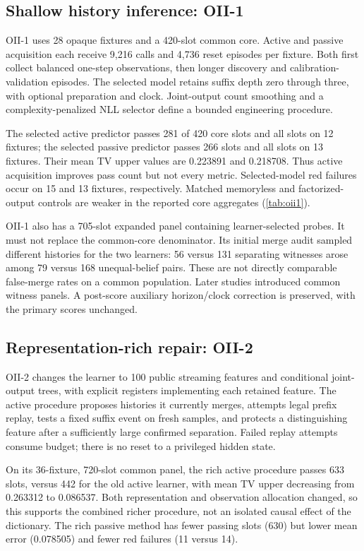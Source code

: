 \subsection{Shallow history inference: OII-1}\label{p3:c03}
OII-1 uses 28 opaque fixtures and a 420-slot common core. Active and passive acquisition each receive 9,216 calls and 4,736 reset episodes per fixture. Both first collect balanced one-step observations, then longer discovery and calibration-validation episodes. The selected model retains suffix depth zero through three, with optional preparation and clock. Joint-output count smoothing and a complexity-penalized NLL selector define a bounded engineering procedure.

The selected active predictor passes 281 of 420 core slots and all slots on 12 fixtures; the selected passive predictor passes 266 slots and all slots on 13 fixtures. Their mean TV upper values are 0.223891 and 0.218708. Thus active acquisition improves pass count but not every metric. Selected-model red failures occur on 15 and 13 fixtures, respectively. Matched memoryless and factorized-output controls are weaker in the reported core aggregates (\cref{tab:oii1}).

OII-1 also has a 705-slot expanded panel containing learner-selected probes. It must not replace the common-core denominator. Its initial merge audit sampled different histories for the two learners: 56 versus 131 separating witnesses arose among 79 versus 168 unequal-belief pairs. These are not directly comparable false-merge rates on a common population. Later studies introduced common witness panels. A post-score auxiliary horizon/clock correction is preserved, with the primary scores unchanged.

\subsection{Representation-rich repair: OII-2}\label{p3:c04}\label{p3:c05}
OII-2 changes the learner to 100 public streaming features and conditional joint-output trees, with explicit registers implementing each retained feature. The active procedure proposes histories it currently merges, attempts legal prefix replay, tests a fixed suffix event on fresh samples, and protects a distinguishing feature after a sufficiently large confirmed separation. Failed replay attempts consume budget; there is no reset to a privileged hidden state.

On its 36-fixture, 720-slot common panel, the rich active procedure passes 633 slots, versus 442 for the old active learner, with mean TV upper decreasing from 0.263312 to 0.086537. Both representation and observation allocation changed, so this supports the combined richer procedure, not an isolated causal effect of the dictionary. The rich passive method has fewer passing slots (630) but lower mean error (0.078505) and fewer red failures (11 versus 14).

